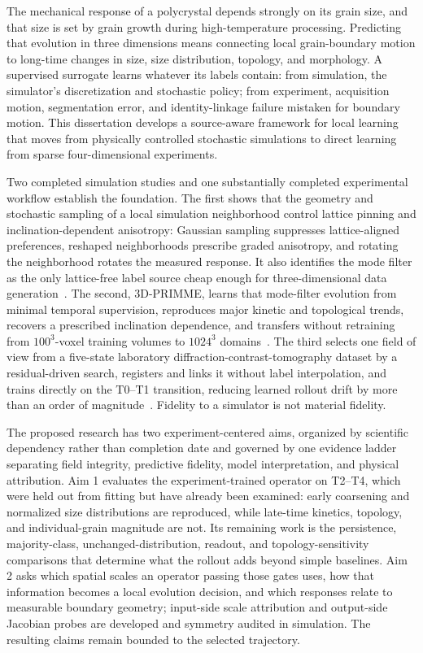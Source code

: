The mechanical response of a polycrystal depends strongly on its grain size, and that size is set by grain growth during high-temperature processing. Predicting that evolution in three dimensions means connecting local grain-boundary motion to long-time changes in size, size distribution, topology, and morphology. A supervised surrogate learns whatever its labels contain: from simulation, the simulator's discretization and stochastic policy; from experiment, acquisition motion, segmentation error, and identity-linkage failure mistaken for boundary motion. This dissertation develops a source-aware framework for local learning that moves from physically controlled stochastic simulations to direct learning from sparse four-dimensional experiments.

Two completed simulation studies and one substantially completed experimental workflow establish the foundation. The first shows that the geometry and stochastic sampling of a local simulation neighborhood control lattice pinning and inclination-dependent anisotropy: Gaussian sampling suppresses lattice-aligned preferences, reshaped neighborhoods prescribe graded anisotropy, and rotating the neighborhood rotates the measured response. It also identifies the mode filter as the only lattice-free label source cheap enough for three-dimensional data generation~\cite{tian2026neighborhood}. The second, 3D-PRIMME, learns that mode-filter evolution from minimal temporal supervision, reproduces major kinetic and topological trends, recovers a prescribed inclination dependence, and transfers without retraining from \(100^3\)-voxel training volumes to \(1024^3\) domains~\cite{tian2026threeDprimme}. The third selects one field of view from a five-state laboratory diffraction-contrast-tomography dataset by a residual-driven search, registers and links it without label interpolation, and trains directly on the T0--T1 transition, reducing learned rollout drift by more than an order of magnitude~\cite{tian2026experiment}. Fidelity to a simulator is not material fidelity.

The proposed research has two experiment-centered aims, organized by scientific dependency rather than completion date and governed by one evidence ladder separating field integrity, predictive fidelity, model interpretation, and physical attribution. Aim 1 evaluates the experiment-trained operator on T2--T4, which were held out from fitting but have already been examined: early coarsening and normalized size distributions are reproduced, while late-time kinetics, topology, and individual-grain magnitude are not. Its remaining work is the persistence, majority-class, unchanged-distribution, readout, and topology-sensitivity comparisons that determine what the rollout adds beyond simple baselines. Aim 2 asks which spatial scales an operator passing those gates uses, how that information becomes a local evolution decision, and which responses relate to measurable boundary geometry; input-side scale attribution and output-side Jacobian probes are developed and symmetry audited in simulation. The resulting claims remain bounded to the selected trajectory.
